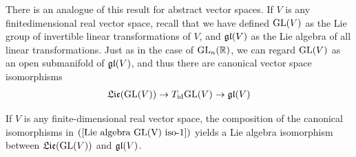 There is an analogue of this result for abstract vector spaces. If $V$ is any finitedimensional real vector space, recall that we have defined $\mathrm{GL}(V)$ as the Lie group of invertible linear transformations of $V$, and $\mathfrak{gl}(V)$ as the Lie algebra of all linear transformations. Just as in the case of $\mathrm{GL}_n(\mathbb{R})$, we can regard $\mathrm{GL}(V)$ as an open submanifold of $\mathfrak{gl}(V)$, and thus there are canonical vector space isomorphisms
\begin{align}\label{Lie algebra GL(V) iso-1}
\mathfrak{Lie}(\mathrm{GL}(V))\to T_{\mathrm{id}}\mathrm{GL}(V)\to\mathfrak{gl}(V)
\end{align}
\begin{corollary}\label{Lie algebra GL(V) iso}
If $V$ is any finite-dimensional real vector space, the composition of the canonical isomorphisms in $(\ref{Lie algebra GL(V) iso-1})$ yields a Lie algebra isomorphism between $\mathfrak{Lie}(\mathrm{GL}(V))$ and $\mathfrak{gl}(V)$.
\end{corollary}

